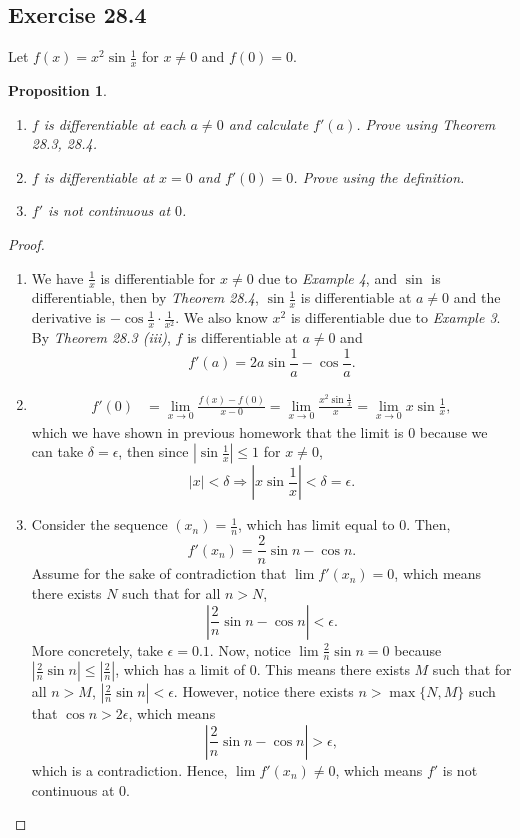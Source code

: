 \documentclass{article}
\newtheorem{proposition}[thm]{Proposition}
\renewcommand*{\implies}{\ensuremath{\Longrightarrow}}
\begin{document}
\subsection*{Exercise 28.4}
Let $f(x)=x^2\sin \frac{1}{x}$ for $x\neq 0$ and $f(0)=0$.
\begin{proposition}
    \begin{enumerate}[label=\textbf{(\alph*)}]\indent
        \item $f$ is differentiable at each $a\neq 0$ and calculate $f'(a)$. Prove using 
        \emph{Theorem 28.3, 28.4}.
        \item $f$ is differentiable at $x=0$ and $f'(0)=0$. Prove using the definition.
        \item $f'$ is not continuous at $0$.
    \end{enumerate}
\end{proposition}
\begin{proof}
    \begin{enumerate}[label=\textbf{(\alph*)}]
        \item 
        We have $\frac{1}{x}$ is differentiable for $x\neq 0$ due to \emph{Example 4}, and $\sin$ is differentiable, 
        then by \emph{Theorem 28.4}, $\sin\frac{1}{x}$ is differentiable at $a\neq 0$ and the derivative 
        is $-\cos \frac{1}{x}\cdot \frac{1}{x^2}$. We also know $x^2$ is differentiable due to 
        \emph{Example 3}. By \emph{Theorem 28.3 (iii)}, $f$ is differentiable at $a\neq 0$ and
        $$f'(a)=2a\sin \frac{1}{a}-\cos \frac{1}{a}.$$

        \item \begin{align*}
            f'(0) & = \lim_{x\to0} \frac{f(x)-f(0)}{x-0} = 
            \lim_{x\to0} \frac{x^2\sin \frac{1}{x}}{x} = 
            \lim_{x\to0} x\sin \frac{1}{x},
        \end{align*}
        which we have shown in previous homework that the limit is 0 because 
        we can take $\delta = \epsilon$, then since $|\sin\frac{1}{x}|\le 1$ for $x\neq 0$,
        $$|x|<\delta\implies \left|x\sin\frac{1}{x}\right|<\delta=\epsilon.$$

        \item Consider the sequence $(x_n)=\frac{1}{n}$, which has limit equal to 0. Then, 
        $$f'(x_n) = \frac{2}{n}\sin n - \cos n.$$ Assume for the sake of contradiction that
        $\lim f'(x_n)=0$, which means there exists $N$ such that for all $n> N$,
        $$\left|\frac{2}{n}\sin n - \cos n\right|<\epsilon.$$ More concretely, take $\epsilon = 0.1$.
        Now, notice $\lim \frac{2}{n}\sin n=0$
        because $\left|\frac{2}{n}\sin n\right|\le \left|\frac{2}{n}\right|$, which has a limit of 0. 
        This means there exists $M$ such that for all $n> M$, $\left|\frac{2}{n}\sin n\right|<\epsilon$.
        However, notice there exists $n> \max\{N,M\}$ such that $\cos n > 2\epsilon$, which means 
        $$\left|\frac{2}{n}\sin n - \cos n\right|>\epsilon,$$
        which is a contradiction. Hence, $\lim f'(x_n)\neq 0$, which means $f'$ is not continuous 
        at 0.

    \end{enumerate}
\end{proof}
\end{document}
